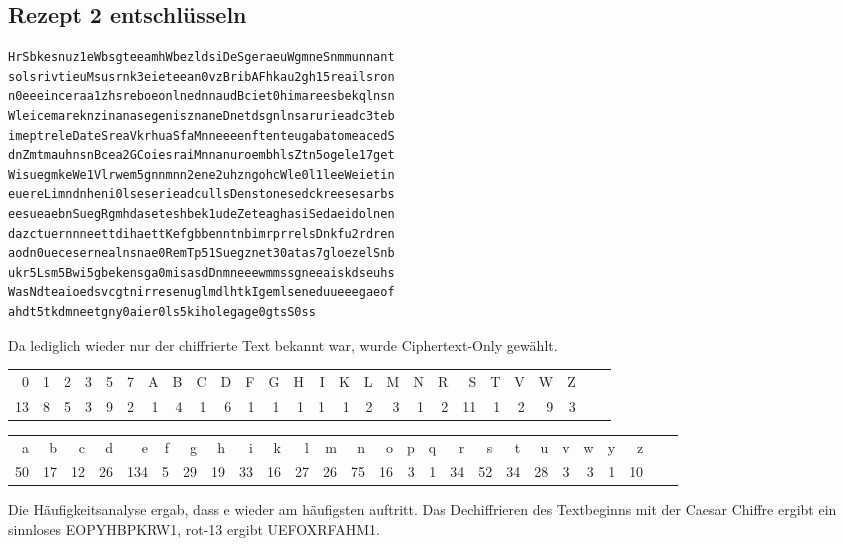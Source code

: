 \subsection{Rezept 2 entschlüsseln}
\label{RezeptZweiEntschluesseln}

\begin{lstlisting}[caption={Das verschlüsselte 2. Rezept: Rezept2NR.txt},
 linewidth=\textwidth,
 breaklines, breakatwhitespace=false]
HrSbkesnuz1eWbsgteeamhWbezldsiDeSgeraeuWgmneSnmmunnant
solsrivtieuMsusrnk3eieteean0vzBribAFhkau2gh15reailsron
n0eeeinceraa1zhsreboeonlnednnaudBciet0himareesbekqlnsn
WleicemareknzinanasegenisznaneDnetdsgnlnsarurieadc3teb
imeptreleDateSreaVkrhuaSfaMnneeeenftenteugabatomeacedS
dnZmtmauhnsnBcea2GCoiesraiMnnanuroembhlsZtn5ogele17get
WisuegmkeWe1Vlrwem5gnnmnn2ene2uhzngohcWle0l1leeWeietin
euereLimndnheni0lseserieadcullsDenstonesedckreesesarbs
eesueaebnSuegRgmhdaseteshbek1udeZeteaghasiSedaeidolnen
dazctuernnneettdihaettKefgbbenntnbimrprrelsDnkfu2rdren
aodn0uecesernealnsnae0RemTp51Suegznet30atas7gloezelSnb
ukr5Lsm5Bwi5gbekensga0misasdDnmneeewmmssgneeaiskdseuhs
WasNdteaioedsvcgtnirresenuglmdlhtkIgemlseneduueeegaeof
ahdt5tkdmneetgny0aier0ls5kiholegage0gtsS0ss
\end{lstlisting}

Da lediglich wieder nur der chiffrierte Text bekannt war, wurde Ciphertext-Only
gewählt.

\begin{table}\footnotesize
\begin{tabular}{*{26}{@{\hspace{1ex}}r}}
 0 & 1 & 2 & 3 & 5 & 7 & A & B & C & D & F & G & H & I & K & L & M & N & R & S & T & V & W & Z \\
 13 & 8 & 5 & 3 & 9 & 2 & 1 & 4 & 1 & 6 & 1 & 1 & 1 & 1 & 1 & 2 & 3 & 1 & 2 & 11 & 1 & 2 & 9 & 3 \\
\end{tabular}

\begin{tabular}{*{26}{@{\hspace{1ex}}r}}
 a & b & c & d & e & f & g & h & i & k & l & m & n & o & p & q & r & s & t & u & v & w & y & z \\
 50 & 17 & 12 & 26 & 134 & 5 & 29 & 19 & 33 & 16 & 27 & 26 & 75 & 16 & 3 & 1 & 34 & 52 & 34 & 28 & 3 & 3 & 1 & 10 \\
\end{tabular}
\end{table}

Die Häufigkeitsanalyse ergab, dass \glqq{}e\grqq{} wieder am häufigsten auftritt. Das
Dechiffrieren des Textbeginns mit der Caesar Chiffre ergibt ein sinnloses
\glqq{}EOPYHBPKRW1\grqq{}, rot-13 ergibt \glqq{}UEFOXRFAHM1\grqq{}.

